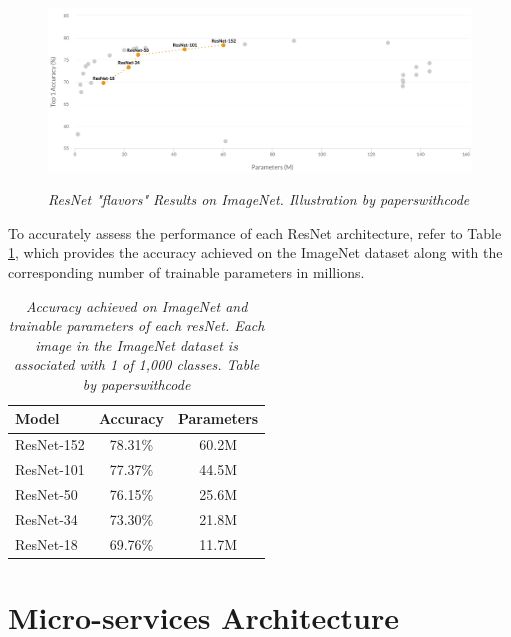 \begin{figure}[H]
  \begin{adjustbox}{width=\textwidth, trim={0pt 0pt 1cm 0pt}, clip}
    \centering
    \includegraphics[width=\textwidth]{imatges/preliminaries/ResNetImageNet.png}
  \end{adjustbox}
  \caption[ResNet "flavors" Results on ImageNet]{\textit{ResNet "flavors" Results on ImageNet. Illustration by paperswithcode}}
  {\label{fig:resnet}}
\end{figure}

To accurately assess the performance of each ResNet architecture, refer to
Table \ref{table:resnet}, which provides the accuracy achieved on the ImageNet
dataset along with the corresponding number of trainable parameters in
millions.

\begin{table}[H]
  \centering
  \begin{tabular}{lcc}
    \toprule
    \textbf{Model} & \textbf{Accuracy} & \textbf{Parameters} \\
    \midrule
    ResNet-152 & 78.31\% & 60.2M \\
    ResNet-101 & 77.37\% & 44.5M \\
    ResNet-50 & 76.15\% & 25.6M \\
    ResNet-34 & 73.30\% & 21.8M \\
    ResNet-18 & 69.76\% & 11.7M \\
    \bottomrule
  \end{tabular}
  \caption[Accuracy achieved on ImageNet and trainable parameters of each resNet.]
  {\textit{Accuracy achieved on ImageNet and trainable parameters of each resNet.
  Each image in the ImageNet dataset is associated with 1 of 1,000 classes. Table by paperswithcode}}
  {\label{table:resnet}}
\end{table}

\section{Micro-services Architecture}


